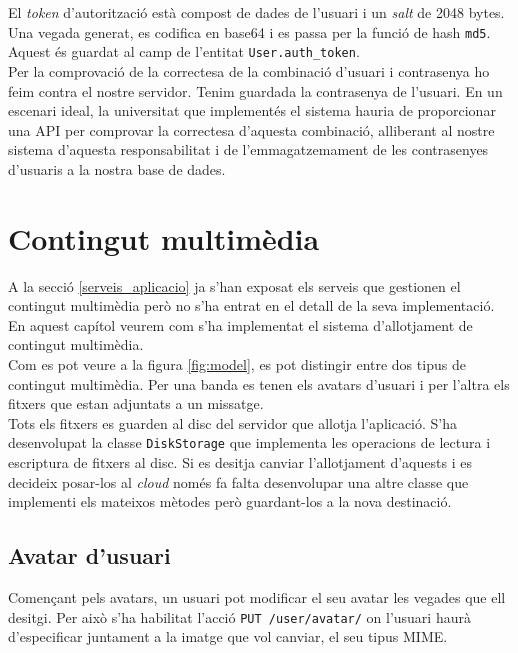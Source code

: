 El \emph{token} d'autorització està compost de dades de l'usuari i un \emph{salt} de 2048 bytes. Una vegada generat, es codifica en base64 i es passa per la funció de hash \texttt{md5}. Aquest és guardat al camp de l'entitat \texttt{User.auth\_token}.\\

Per la comprovació de la correctesa de la combinació d'usuari i contrasenya ho feim contra el nostre servidor. Tenim guardada la contrasenya de l'usuari. En un escenari ideal, la universitat que implementés el sistema hauria de proporcionar una \ac{API} per comprovar la correctesa d'aquesta combinació, alliberant al nostre sistema d'aquesta responsabilitat i de l'emmagatzemament de les contrasenyes d'usuaris a la nostra base de dades.\\

\section{Contingut multimèdia} \label{contingut_multimedia}

A la secció \ref{serveis_aplicacio} ja s'han exposat els serveis que gestionen el contingut multimèdia però no s'ha entrat en el detall de la seva implementació. En aquest capítol veurem com s'ha implementat el sistema d'allotjament de contingut multimèdia.\\

Com es pot veure a la figura \ref{fig:model}, es pot distingir entre dos tipus de contingut multimèdia. Per una banda es tenen els avatars d'usuari i per l'altra els fitxers que estan adjuntats a un missatge.\\

Tots els fitxers es guarden al disc del servidor que allotja l'aplicació. S'ha desenvolupat la classe \texttt{DiskStorage} que implementa les operacions de lectura i escriptura de fitxers al disc. Si es desitja canviar l'allotjament d'aquests i es decideix posar-los al \emph{cloud} només fa falta desenvolupar una altre classe que implementi els mateixos mètodes però guardant-los a la nova destinació.\\

\subsection{Avatar d'usuari}

Començant pels avatars, un usuari pot modificar el seu avatar les vegades que ell desitgi. Per això s'ha habilitat l'acció \texttt{PUT /user/avatar/} on l'usuari haurà d'especificar juntament a la imatge que vol canviar, el seu tipus \ac{MIME}.

